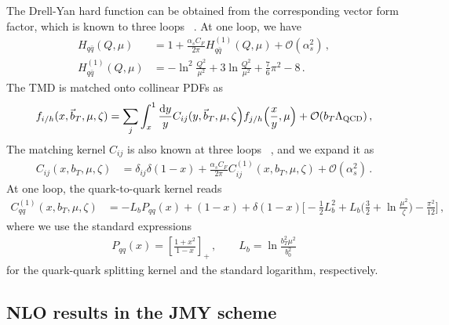 \documentclass[11pt,a4paper]{article}
\newcommand{\df}{\mathrm{d}}
\newcommand{\cO}{\mathcal{O}}
\newcommand{\nn}{\nonumber}
\newcommand{\as}{\alpha_s}
\newcommand{\LQCD}{\Lambda_\mathrm{QCD}}
\newcommand{\bt}{\vec b_T}
\begin{document}
The Drell-Yan hard function can be obtained from the corresponding vector form factor,
which is known to three loops%
~\cite{Kramer:1986sg, Matsuura:1987wt, Matsuura:1988sm, Gehrmann:2005pd, Moch:2005tm, Moch:2005id, Baikov:2009bg, Lee:2010cga, Gehrmann:2010ue}.
At one loop, we have
\begin{align} \label{eq:app:hard_nlo}
 H_{q \bar q}(Q, \mu) &
 = 1 + \frac{\as C_F}{2\pi} H_{q \bar q}^{(1)}(Q, \mu) + \cO(\as^2)
\,,\nn\\
 H_{q \bar q}^{(1)}(Q, \mu) &
 = - \ln^2\frac{Q^2}{\mu^2} + 3 \ln\frac{Q^2}{\mu^2} + \frac76 \pi^2 - 8
\,.\end{align}
The TMD is matched onto collinear PDFs as
\begin{align} \label{eq:app:tmd_matching_Collins}
 f_{i/h}(x, \bt, \mu , \zeta) = \sum_j \int_x^1 \frac{\df y}{y} C_{ij}(y, \bt, \mu, \zeta\Bigr) f_{j/h}\Bigl(\frac{x}{y}, \mu\Bigr) + \cO(b_T \LQCD)
\,,\end{align}
The matching kernel $C_{ij}$ is also known at three loops%
~\cite{Catani:2012qa, Gehrmann:2012ze, Gehrmann:2014yya, Li:2016ctv, Echevarria:2016scs, Luebbert:2016itl,Luo:2019hmp, Luo:2019szz, Ebert:2020yqt, Luo:2020epw},
and we expand it as
\begin{align}  \label{eq:app:tmd_kernel}
 C_{ij}(x, b_T, \mu, \zeta) &
 = \delta_{ij} \delta(1-x) + \frac{\as C_F}{2\pi} C_{ij}^{(1)}(x, b_T, \mu, \zeta) + \cO(\as^2)
\,.\end{align}
At one loop, the quark-to-quark kernel reads
\begin{align} \label{eq:app:tmd_kernel_nlo}
 C_{qq}^{(1)}(x, b_T, \mu, \zeta) &
 = -L_b P_{qq}(x) + (1-x)
 + \delta(1-x) \biggl[ - \frac{1}{2} L_b^2 + L_b \biggl(\frac{3}{2} + \ln\frac{\mu^2}{\zeta} \biggr) - \frac{\pi^2}{12}  \biggr]
\,,\!\!\end{align}
where we use the standard expressions
\begin{align}
 P_{qq}(x) = \left[\frac{1+x^2}{1-x}\right]_+
\,,\qquad
 L_b = \ln\frac{b_T^2 \mu^2}{b_0^2}
\end{align}
for the quark-quark splitting kernel and the standard logarithm, respectively.


\subsection{NLO results in the JMY scheme}
\label{sec:nlo-jmy}
\end{document}
